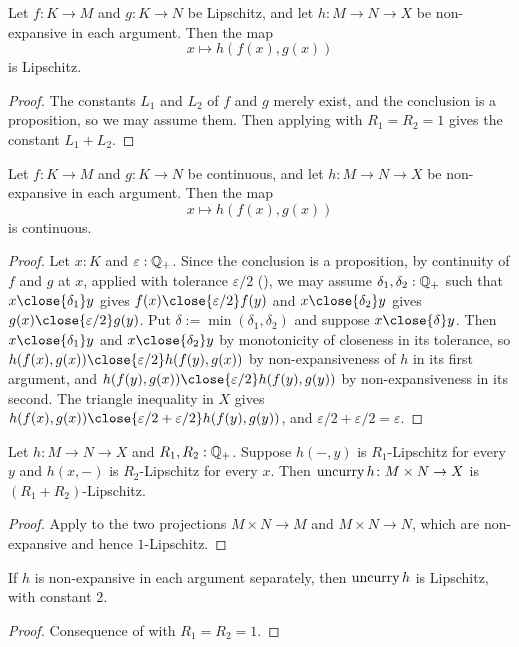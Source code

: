 \begin{corollary}
  \label{composeL2}
  Let $f \colon K \to M$ and $g \colon K \to N$ be Lipschitz, and let $h \colon M \to N \to X$ be non-expansive in each argument. Then the map
  \[
    x \mapsto h(f(x), g(x))
  \]
  is Lipschitz.
\end{corollary}
\begin{proof}
  The constants $L_1$ and $L_2$ of $f$ and $g$ merely exist, and the conclusion is a proposition, so we may assume them. Then applying  with $R_1 = R_2 = 1$ gives the constant $L_1 + L_2$.
\end{proof}

\begin{lemma}
  \label{composeC2}
  Let $f \colon K \to M$ and $g \colon K \to N$ be continuous, and let $h \colon M \to N \to X$ be non-expansive in each argument. Then the map
  \[
    x \mapsto h(f(x), g(x))
  \]
  is continuous.
\end{lemma}
\begin{proof}
  Let $x : K$ and $\varepsilon : \mathbb{Q}_{+}$. Since the conclusion is a proposition, by continuity of $f$ and $g$ at $x$, applied with tolerance $\varepsilon/2$ (), we may assume $\delta_1, \delta_2 : \mathbb{Q}_{+}$ such that $x \close{\delta_1} y$ gives $f(x) \close{\varepsilon/2} f(y)$ and $x \close{\delta_2} y$ gives $g(x) \close{\varepsilon/2} g(y)$. Put $\delta := \min(\delta_1, \delta_2)$ and suppose $x \close{\delta} y$. Then $x \close{\delta_1} y$ and $x \close{\delta_2} y$ by monotonicity of closeness in its tolerance, so $h(f(x), g(x)) \close{\varepsilon/2} h(f(y), g(x))$ by non-expansiveness of $h$ in its first argument, and $h(f(y), g(x)) \close{\varepsilon/2} h(f(y), g(y))$ by non-expansiveness in its second. The triangle inequality in $X$ gives $h(f(x), g(x)) \close{\varepsilon/2 + \varepsilon/2} h(f(y), g(y))$, and $\varepsilon/2 + \varepsilon/2 = \varepsilon$.
\end{proof}

\begin{lemma}
  \label{uncurryIsLipschitzWith}
  Let $h \colon M \to N \to X$ and $R_1, R_2 : \mathbb{Q}_{+}$. Suppose $h(-, y)$ is $R_1$-Lipschitz for every $y$ and $h(x, -)$ is $R_2$-Lipschitz for every $x$. Then $\operatorname{uncurry} h \colon M \times N \to X$ is $(R_1 + R_2)$-Lipschitz.
\end{lemma}
\begin{proof}
  Apply  to the two projections $M \times N \to M$ and $M \times N \to N$, which are non-expansive and hence $1$-Lipschitz.
\end{proof}

\begin{corollary}
  \label{uncurryNE2}
  If $h$ is non-expansive in each argument separately, then $\operatorname{uncurry} h$ is Lipschitz, with constant $2$.
\end{corollary}
\begin{proof}
  Consequence of  with $R_1 = R_2 = 1$.
\end{proof}
